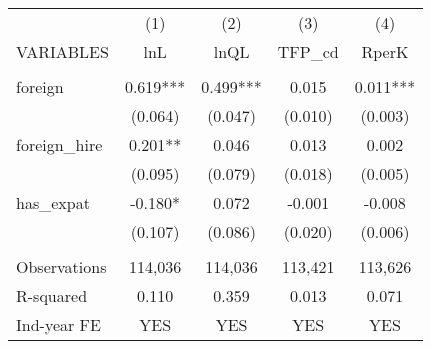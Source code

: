 \begin{tabular}{lcccc} \hline
 & (1) & (2) & (3) & (4) \\
VARIABLES & lnL & lnQL & TFP\_cd & RperK \\ \hline
 &  &  &  &  \\
foreign & 0.619*** & 0.499*** & 0.015 & 0.011*** \\
 & (0.064) & (0.047) & (0.010) & (0.003) \\
foreign\_hire & 0.201** & 0.046 & 0.013 & 0.002 \\
 & (0.095) & (0.079) & (0.018) & (0.005) \\
has\_expat & -0.180* & 0.072 & -0.001 & -0.008 \\
 & (0.107) & (0.086) & (0.020) & (0.006) \\
 &  &  &  &  \\
Observations & 114,036 & 114,036 & 113,421 & 113,626 \\
R-squared & 0.110 & 0.359 & 0.013 & 0.071 \\
 Ind-year FE & YES & YES & YES & YES \\ \hline
\end{tabular}
